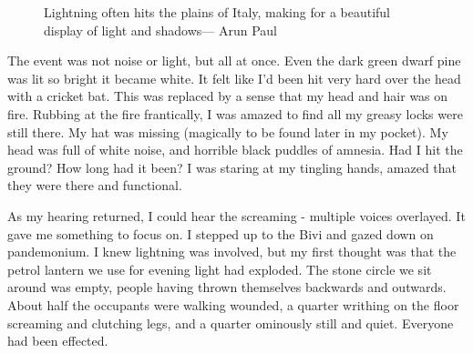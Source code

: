 \begin{figure*}[t!]
\checkoddpage \ifoddpage \forcerectofloat \else \forceversofloat \fi
\centering
{}
\caption{Lightning often hits the plains of Italy, making for a beautiful display of light and shadows--- Arun Paul}
\label{lightning}
\end{figure*}


The event was not noise or light, but all at once.  Even the dark green dwarf pine was lit so bright it became white. It felt like I'd been hit very hard over the head with a cricket bat. This was replaced by a sense that my head and hair was on fire. Rubbing at the fire frantically, I was amazed to find all my greasy locks were still there. My hat was missing (magically to be found later in my pocket). My head was full of white noise, and horrible black puddles of amnesia. Had I hit the ground? How long had it been? I was staring at my tingling hands, amazed that they were there and functional. 

As my hearing returned, I could hear the screaming - multiple voices overlayed. It gave me something to focus on. I stepped up to the Bivi and gazed down on pandemonium. 
I knew lightning was involved, but my first thought was that the petrol lantern we use for evening light had exploded. The stone circle we sit around was empty, people having thrown themselves backwards and outwards. About half the occupants were walking wounded, a quarter writhing on the floor screaming and clutching legs, and a quarter ominously still and quiet. Everyone had been effected.


